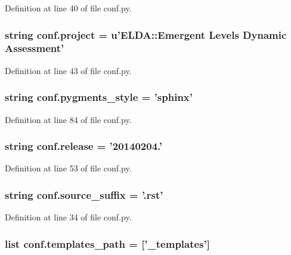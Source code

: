 Definition at line 40 of file conf.\-py.

\hypertarget{a00132_a45653c983098153b78e33600e39230eb}{
\subsubsection[{project}]{\setlength{\rightskip}{0pt plus 5cm}string conf.\-project = u'E\-L\-D\-A\-::\-Emergent Levels Dynamic Assessment'}}\label{a00132_a45653c983098153b78e33600e39230eb}


Definition at line 43 of file conf.\-py.

\hypertarget{a00132_a641130e096b26cba8a5d63ed38684de7}{
\subsubsection[{pygments\-\_\-style}]{\setlength{\rightskip}{0pt plus 5cm}string conf.\-pygments\-\_\-style = 'sphinx'}}\label{a00132_a641130e096b26cba8a5d63ed38684de7}


Definition at line 84 of file conf.\-py.

\hypertarget{a00132_a325dc746d8bf05c54d26351c35a21d90}{
\subsubsection[{release}]{\setlength{\rightskip}{0pt plus 5cm}string conf.\-release = '20140204.'}}\label{a00132_a325dc746d8bf05c54d26351c35a21d90}


Definition at line 53 of file conf.\-py.

\hypertarget{a00132_a10af2a769eb3bd3322e874f677e435b1}{
\subsubsection[{source\-\_\-suffix}]{\setlength{\rightskip}{0pt plus 5cm}string conf.\-source\-\_\-suffix = '.rst'}}\label{a00132_a10af2a769eb3bd3322e874f677e435b1}


Definition at line 34 of file conf.\-py.

\hypertarget{a00132_ae850ae634911b713e036b43894fdd525}{
\subsubsection[{templates\-\_\-path}]{\setlength{\rightskip}{0pt plus 5cm}list conf.\-templates\-\_\-path = \mbox{[}'\-\_\-templates'\mbox{]}}}\label{a00132_ae850ae634911b713e036b43894fdd525}


